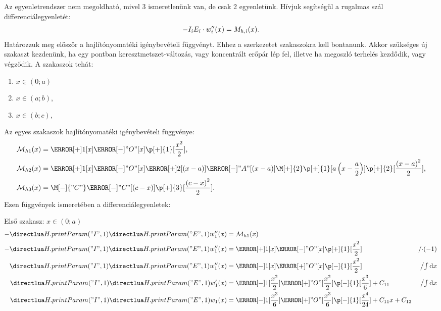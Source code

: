 Az egyenletrendszer nem megoldható, mivel 3 ismeretlenünk van, de csak 2
egyenletünk. Hívjuk segítségül a rugalmas szál differenciálegyenletét:
\begin{equation}
  -I_i E_i \cdot w_i''(x) = M_{h,i}(x)
  \text.
  \label{eq:diffeq-base}
\end{equation}
Határozzuk meg először a hajlítónyomatéki igénybevételi függvényt. Ehhez
a szerkezetet szakaszokra kell bontanunk. Akkor szükséges új szakaszt
kezdenünk, ha egy pontban keresztmetszet-változás, vagy koncentrált erőpár
lép fel, illetve ha megoszló terhelés kezdődik, vagy végződik. A szakaszok
tehát:
\begin{multicols}{3}
  \begin{enumerate}
    \item $x \in (0; a)$
    \item $x \in (a; b)$,
    \item $x \in (b; c)$,
  \end{enumerate}
\end{multicols}
Az egyes szakaszok hajlítónyomatéki igénybevételi függvénye:
\begin{align}
  \spec M_{h1}(x) & =
  \F[+]{1}[x]
  \F[-]{"O"}[x]
  \p[+]{1}[\frac{x^2}{2}]
  \text,
  \\
  \spec M_{h2}(x) & =
  \F[+]{1}[x]
  \F[-]{"O"}[x]
  \F[+]{2}[(x - a)]
  \F[-]{"A"}[(x - a)]
  \M[+]{2}
  \p[+]{1}[a \left( x - \frac{a}{2} \right)]
  \p[+]{2}[ \frac{\left( x - a \right)^2 }{2}]
  \text,
  \\
  \spec M_{h3}(x) & =
  \M[-]{"C"}
  \F[-]{"C"}[(c - x)]
  \p[+]{3}[\frac{\left( c - x \right)^2}{2}]
  \text.
\end{align}
Ezen függvények ismeretében a differenciálegyenletek:
\newcommand{\op}[1]{&{\textstyle \left/ #1 \right.}}
\newcommand{\opint}{\op{\int \mathrm d x}}


Első szakasz: $x \in (0;a)$
\begin{align}
  - \I{1} \E{1} w_1''(x) & =
  \spec M_{h1}(x)
  \\
  - \I{1} \E{1} w_1''(x) & =
  \F[+]{1}[x]
  \F[-]{"O"}[x]
  \p[+]{1}[\frac{x^2}{2}]
  \op{\cdot(-1)}
  \\
  \I{1} \E{1} w_1''(x)   & =
  \F[-]{1}[x]
  \F[+]{"O"}[x]
  \p[-]{1}[\frac{x^2}{2}]
  \opint{}
  \\
  \I{1} \E{1} w_1'(x)    & =
  \F[-]{1}[\frac{x^2}{2}]
  \F[+]{"O"}[\frac{x^2}{2}]
  \p[-]{1}[\frac{x^3}{6}]
  + C_{11}
  \opint{}
  \\
  \I{1} \E{1} w_1(x)     & =
  \F[-]{1}[\frac{x^3}{6}]
  \F[+]{"O"}[\frac{x^3}{6}]
  \p[-]{1}[\frac{x^4}{24}]
  + C_{11} x
  + C_{12}
\end{align}


